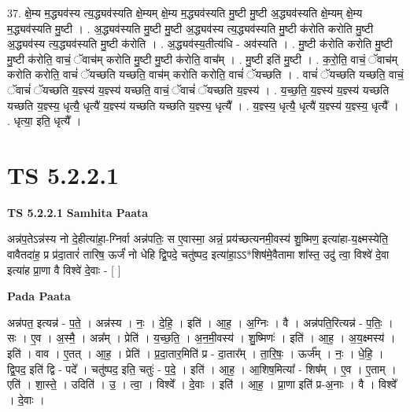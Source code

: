\documentclass[17pt]{extarticle}
\begin{document}
37. क्षे॒म्य म॒द्ध्यव॑स्य त्य॒द्ध्यव॑स्यति क्षे॒म्यम् क्षे॒म्य म॒द्ध्यव॑स्यति मु॒ष्टी मु॒ष्टी अ॒द्ध्यव॑स्यति क्षे॒म्यम् क्षे॒म्य म॒द्ध्यव॑स्यति मु॒ष्टी । . अ॒द्ध्यव॑स्यति मु॒ष्टी मु॒ष्टी अ॒द्ध्यव॑स्य त्य॒द्ध्यव॑स्यति मु॒ष्टी क॑रोति करोति मु॒ष्टी अ॒द्ध्यव॑स्य त्य॒द्ध्यव॑स्यति मु॒ष्टी क॑रोति । . अ॒द्ध्यव॑स्य॒तीत्य॑धि - अव॑स्यति । . मु॒ष्टी क॑रोति करोति मु॒ष्टी मु॒ष्टी क॑रोति॒ वाचं॒ ॅवाच॑म् करोति मु॒ष्टी मु॒ष्टी क॑रोति॒ वाच᳚म् । . मु॒ष्टी इति॑ मु॒ष्टी । . क॒रो॒ति॒ वाचं॒ ॅवाच॑म् करोति करोति॒ वाचं॑ ॅयच्छति यच्छति॒ वाच॑म् करोति करोति॒ वाचं॑ ॅयच्छति । . वाचं॑ ॅयच्छति यच्छति॒ वाचं॒ ॅवाचं॑ ॅयच्छति य॒ज्ञ्स्य॑ य॒ज्ञ्स्य॑ यच्छति॒ वाचं॒ ॅवाचं॑ ॅयच्छति य॒ज्ञ्स्य॑ । . य॒च्छ॒ति॒ य॒ज्ञ्स्य॑ य॒ज्ञ्स्य॑ यच्छति यच्छति य॒ज्ञ्स्य॒ धृत्यै॒ धृत्यै॑ य॒ज्ञ्स्य॑ यच्छति यच्छति य॒ज्ञ्स्य॒ धृत्यै᳚ । . य॒ज्ञ्स्य॒ धृत्यै॒ धृत्यै॑ य॒ज्ञ्स्य॑ य॒ज्ञ्स्य॒ धृत्यै᳚ । . धृत्या॒ इति॒ धृत्यै᳚ । \newline
\pagebreak
{}

\section{ TS 5.2.2.1 }

\textbf{TS 5.2.2.1 } \newline
\textbf{Samhita Paata} \newline

अन्न॑प॒तेऽन्न॑स्य नो दे॒हीत्या॑हा॒-ग्निर्वा अन्न॑पतिः॒ स ए॒वास्मा॒ अन्नं॒ प्रय॑च्छत्यनमी॒वस्य॑ शु॒ष्मिण॒ इत्या॑हा-य॒क्ष्मस्येति॒ वावैतदा॑ह॒ प्र प्र॑दा॒तारं॑ तारिष॒ ऊर्जं॑ नो धेहि द्वि॒पदे॒ चतु॑ष्पद॒ इत्या॑हा॒ऽऽ*शिष॑मे॒वैतामा शा᳚स्त॒ उदु॑ त्वा॒ विश्वे॑ दे॒वा इत्या॑ह प्रा॒णा वै विश्वे॑ दे॒वाः - [  ] \newline

\textbf{Pada Paata} \newline

अन्न॑पत॒ इत्यन्न॑ - प॒ते॒ । अन्न॑स्य । नः॒ । दे॒हि॒ । इति॑ । आ॒ह॒ । अ॒ग्निः । वै । अन्न॑पति॒रित्यन्न॑ - प॒तिः॒ । सः । ए॒व । अ॒स्मै॒ । अन्न᳚म् । प्रेति॑ । य॒च्छ॒ति॒ । अ॒न॒मी॒वस्य॑ । शु॒ष्मिणः॑ । इति॑ । आ॒ह॒ । अ॒य॒क्ष्मस्य॑ । इति॑ । वाव । ए॒तत् । आ॒ह॒ । प्रेति॑ । प्र॒दा॒तार॒मिति॑ प्र - दा॒तार᳚म् । ता॒रि॒षः॒ । ऊर्ज᳚म् । नः॒ । धे॒हि॒ । द्वि॒पद॒ इति॑ द्वि - पदे᳚ । चतु॑ष्पद॒ इति॒ चतुः॑ - प॒दे॒ । इति॑ । आ॒ह॒ । आ॒शिष॒मित्या᳚ - शिष᳚म् । ए॒व । ए॒ताम् । एति॑ । शा॒स्ते॒ । उदिति॑ । उ॒ । त्वा॒ । विश्वे᳚ । दे॒वाः । इति॑ । आ॒ह॒ । प्रा॒णा इति॑ प्र-अ॒नाः । वै । विश्वे᳚ । दे॒वाः ।  \newline
\end{document}

